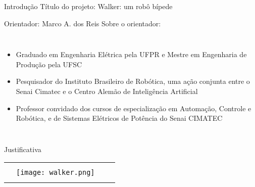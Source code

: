 \begin{frame}[t]{Introdução} 
    \transdissolve[duration=0.5]
    Título do projeto: Walker: um robô bípede

    Orientador: Marco A. dos Reis
    \newline
    \newline
    Sobre o orientador:
        \begin{columns}[t]
                \begin{itemize}
                    \item Graduado em Engenharia Elétrica pela UFPR e Mestre em Engenharia de Produção pela UFSC
                    \item Pesquisador do Instituto Brasileiro de Robótica, uma ação conjunta entre o Senai Cimatec e o Centro Alemão de Inteligência Artificial
                    \item Professor convidado dos cursos de especialização em Automação, Controle e Robótica, e de Sistemas Elétricos de Potência do Senai CIMATEC
                \end{itemize}
        \end{columns}
\end{frame}
\begin{frame}[c]{Justificativa}
    \begin{tabular}{cccc}
        \rule{73pt}{0ex}  &   \texttt{[image: walker.png]}
    \end{tabular}

\end{frame}
